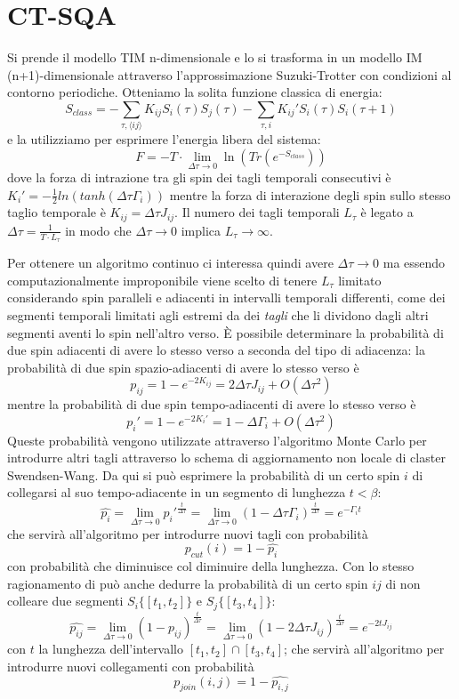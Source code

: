 \section{CT-SQA}
Si prende il modello TIM n-dimensionale e lo si trasforma in un modello IM (n+1)-dimensionale attraverso l'approssimazione Suzuki-Trotter con condizioni al contorno periodiche. Otteniamo la solita funzione classica di energia:
$$S_{class} = - \sum_{\tau,\langle ij \rangle} K_{ij} S_i(\tau) S_j(\tau) - \sum_{\tau, i} K_{ij}' S_i(\tau) S_i(\tau+1)$$
e la utilizziamo per esprimere l'energia libera del sistema:
$$F = - T \cdot \lim_{\Delta \tau \to 0} \ln(Tr(e^{-S_{class}}))$$
dove la forza di intrazione tra gli spin dei tagli temporali consecutivi è $K_{i}' = - \frac{1}{2} ln( tanh( \Delta \tau \Gamma_i) )$ mentre la forza di interazione degli spin sullo stesso taglio temporale è $K_{ij} = \Delta \tau J_{ij}$. Il numero dei tagli temporali $L_{\tau}$ è legato a $\Delta \tau = \frac{1}{T \cdot L_{\tau}}$ in modo che $\Delta \tau \to 0$ implica $L_{\tau} \to \infty$.

Per ottenere un algoritmo continuo ci interessa quindi avere $\Delta \tau \to 0$ ma essendo computazionalmente improponibile viene scelto di tenere $L_{\tau}$ limitato considerando spin paralleli e adiacenti in intervalli temporali differenti, come dei segmenti temporali limitati agli estremi da dei \textit{tagli} che li dividono dagli altri segmenti aventi lo spin nell'altro verso.
È possibile determinare la probabilità di due spin adiacenti di avere lo stesso verso a seconda del tipo di adiacenza:
la probabilità di due spin spazio-adiacenti di avere lo stesso verso è
$$p_{ij} = 1 - e^{-2K_{ij}} = 2\Delta \tau J_{ij} + O(\Delta \tau^2)$$
mentre la probabilità di due spin tempo-adiacenti di avere lo stesso verso è
$$p_i' = 1 - e^{-2K_{i}'} = 1 - \Delta \Gamma_{i} + O(\Delta \tau^2)$$
Queste probabilità vengono utilizzate attraverso l'algoritmo Monte Carlo per introdurre altri tagli attraverso lo schema di aggiornamento non locale di claster Swendsen-Wang.
Da qui si può esprimere la probabilità di un certo spin $i$ di collegarsi al suo tempo-adiacente in un segmento di lunghezza $t < \beta$:
$$\hat{p_i} = \lim_{\Delta \tau \to 0} p_i'^{\frac{t}{\Delta \tau}} = \lim_{\Delta \tau \to 0} (1 - \Delta \tau \Gamma_i)^\frac{t}{\Delta \tau} = e^{- \Gamma_i t}$$
che servirà all'algoritmo per introdurre nuovi tagli con probabilità
$$p_{cut}(i) = 1 - \hat{p_i}$$
con probabilità che diminuisce col diminuire della lunghezza.
Con lo stesso ragionamento di può anche dedurre la probabilità di un certo spin $ij$ di non colleare due segmenti $S_i\{[t_1, t_2]\}$ e $S_j\{[t_3, t_4]\}$:
$$\hat{p_{ij}} = \lim_{\Delta \tau \to 0} (1 - p_{ij})^\frac{t}{\Delta \tau} = \lim_{\Delta \tau \to 0} (1 - 2\Delta \tau J_{ij})^\frac{t}{\Delta \tau} = e^{-2 t J_{ij}}$$
con $t$ la lunghezza dell'intervallo $[t_1, t_2] \cap [t_3, t_4]$; che servirà all'algoritmo per introdurre nuovi collegamenti con probabilità
$$p_{join}(i,j) = 1 - \hat{p_{i,j}}$$
